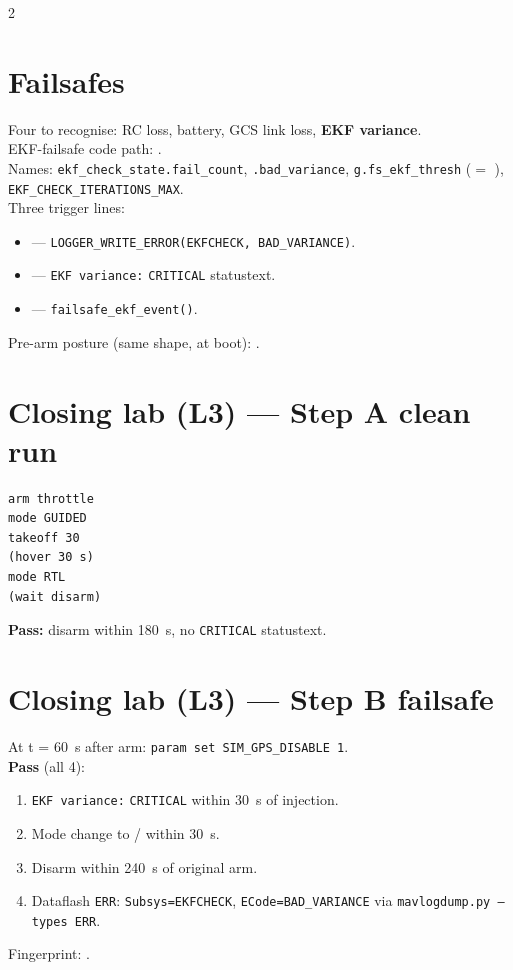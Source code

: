 \documentclass[a4paper,9pt,landscape]{extarticle}
\begin{document}
\begin{multicols*}{2}
\section*{Failsafes}
Four to recognise: RC loss, battery, GCS link loss, \textbf{EKF variance}.\\
EKF-failsafe code path: .\\
Names: \texttt{ekf\_check\_state.fail\_count}, \texttt{.bad\_variance}, \texttt{g.fs\_ekf\_thresh} ($=$ ), \texttt{EKF\_CHECK\_ITERATIONS\_MAX}.\\
Three trigger lines:
\begin{itemize}
  \item {} --- \texttt{LOGGER\_WRITE\_ERROR(EKFCHECK, BAD\_VARIANCE)}.
  \item {} --- \texttt{EKF variance:} \texttt{CRITICAL} statustext.
  \item {} --- \texttt{failsafe\_ekf\_event()}.
\end{itemize}
Pre-arm posture (same shape, at boot): .

\section*{Closing lab (L3) --- Step A clean run}
\begin{verbatim}
arm throttle
mode GUIDED
takeoff 30
(hover 30 s)
mode RTL
(wait disarm)
\end{verbatim}
\textbf{Pass:} disarm within 180~s, no \texttt{CRITICAL} statustext.

\section*{Closing lab (L3) --- Step B failsafe}
At t = 60~s after arm: \texttt{param set SIM\_GPS\_DISABLE 1}.\\
\textbf{Pass} (all 4):
\begin{enumerate}
  \item \texttt{EKF variance:} \texttt{CRITICAL} within 30~s of injection.
  \item Mode change to / within 30~s.
  \item Disarm within 240~s of original arm.
  \item Dataflash \texttt{ERR}: \texttt{Subsys=EKFCHECK}, \texttt{ECode=BAD\_VARIANCE} via \texttt{mavlogdump.py --types ERR}.
\end{enumerate}
Fingerprint: .


\end{multicols*}
\end{document}

